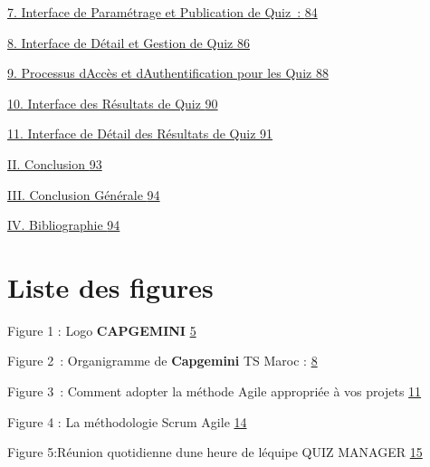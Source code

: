 \documentclass[12pt,a4paper,twoside]{report}
\begin{document}
\protect\hyperlink{interface-de-paramuxe9trage-et-publication-de-quiz}{7.
Interface de Paramétrage et Publication de Quiz~:
\protect\hyperlink{interface-de-paramuxe9trage-et-publication-de-quiz}{84}}

\protect\hyperlink{interface-de-duxe9tail-et-gestion-de-quiz}{8.
Interface de Détail et Gestion de Quiz
\protect\hyperlink{interface-de-duxe9tail-et-gestion-de-quiz}{86}}

\protect\hyperlink{processus-daccuxe8s-et-dauthentification-pour-les-quiz}{9.
Processus d\textquotesingle Accès et d\textquotesingle Authentification
pour les Quiz
\protect\hyperlink{processus-daccuxe8s-et-dauthentification-pour-les-quiz}{88}}

\protect\hyperlink{interface-des-ruxe9sultats-de-quiz}{10. Interface des
Résultats de Quiz
\protect\hyperlink{interface-des-ruxe9sultats-de-quiz}{90}}

\protect\hyperlink{interface-de-duxe9tail-des-ruxe9sultats-de-quiz}{11.
Interface de Détail des Résultats de Quiz
\protect\hyperlink{interface-de-duxe9tail-des-ruxe9sultats-de-quiz}{91}}

\protect\hyperlink{conclusion-4}{II. Conclusion
\protect\hyperlink{conclusion-4}{93}}

\protect\hyperlink{conclusion-guxe9nuxe9rale-1}{III. Conclusion Générale
\protect\hyperlink{conclusion-guxe9nuxe9rale-1}{94}}

\protect\hyperlink{_Toc204179750}{IV. Bibliographie
\protect\hyperlink{_Toc204179750}{94}}

\hypertarget{liste-des-figures}{%
\section{\texorpdfstring{Liste des figures
}{Liste des figures }}\label{liste-des-figures}}

Figure 1 : Logo \textbf{CAPGEMINI} \protect\hyperlink{_Toc203823413}{5}

Figure 2~: Organigramme de \textbf{Capgemini} TS Maroc :
\protect\hyperlink{_Toc203823414}{8}

Figure 3~: Comment adopter la méthode Agile appropriée à vos projets
\protect\hyperlink{_Toc203823415}{11}

Figure 4 : La méthodologie Scrum Agile
\protect\hyperlink{_Toc203823416}{14}

Figure 5:Réunion quotidienne d\textquotesingle une heure de
l\textquotesingle équipe QUIZ MANAGER
\protect\hyperlink{_Toc203823417}{15}
\end{document}
